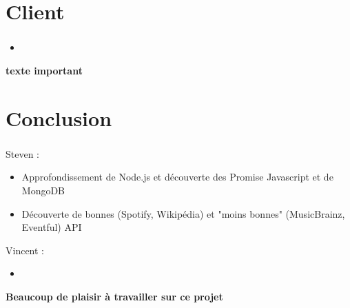 \documentclass[10pt]{beamer}
\begin{document}
\section{Client}
\begin{frame}
	\frametitle{\secname}
	\begin{itemize}
		\item 
	\end{itemize}
	\Large\textbf{texte important}
\end{frame}

\section{Conclusion}
\begin{frame}
	\frametitle{\secname}
	Steven :
	\begin{itemize}
		\item Approfondissement de Node.js et découverte des Promise Javascript et de MongoDB
		\item Découverte de bonnes (Spotify, Wikipédia) et "moins bonnes" (MusicBrainz, Eventful) API
	\end{itemize}
	Vincent :
	\begin{itemize}
		\item 
	\end{itemize}
	\Large\textbf{Beaucoup de plaisir à travailler sur ce projet}
\end{frame}
\end{document}
